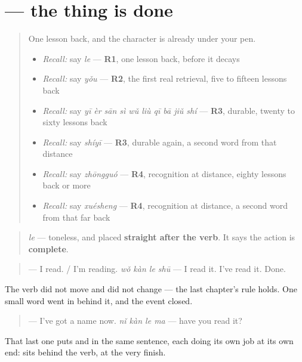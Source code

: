 \section[\texorpdfstring{\zh{了} (le)}{了 (le)}]{ — the thing is done}

\label{lesson:ZH-C25-le-dongci}



\begin{quote}
One lesson back, and the character is already under your pen.

\begin{itemize}
\raggedright
  \item \emph{Recall:} say \emph{le} — \textbf{R1}, one lesson back, before it decays
  \item \emph{Recall:} say \emph{yǒu} — \textbf{R2}, the first real retrieval, five to fifteen lessons back
  \item \emph{Recall:} say \emph{yī èr sān sì wǔ liù qī bā jiǔ shí} — \textbf{R3}, durable, twenty to sixty lessons back
  \item \emph{Recall:} say \emph{shíyī} — \textbf{R3}, durable again, a second word from that distance
  \item \emph{Recall:} say \emph{zhōngguó} — \textbf{R4}, recognition at distance, eighty lessons back or more
  \item \emph{Recall:} say \emph{xuésheng} — \textbf{R4}, recognition at distance, a second word from that far back
\end{itemize}
\end{quote}

\begin{grammarlens}[title={Grammar Lens: verb + \zh{了} = finished}]
\begin{quote}
\textbf{} \emph{le} — toneless, and placed \textbf{straight after the verb}. It says the action is \textbf{complete}.
\end{quote}

\begin{quote}
\textbf{} — I read. / I'm reading. \textbf{} \emph{wǒ kàn le shū} — I read it. I've read it. Done.
\end{quote}

The verb did not move and did not change — the last chapter's rule holds. One small word went in behind it, and the event closed.

\begin{quote}
\textbf{} — I've got a name now. \textbf{} \emph{nǐ kàn le ma} — have you read it?
\end{quote}

That last one puts  and  in the same sentence, each doing its own job at its own end:  sits behind the verb,  at the very finish.
\end{grammarlens}

